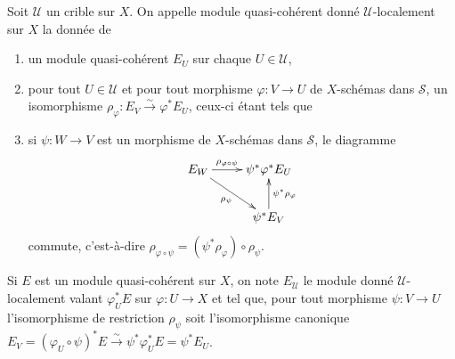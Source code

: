 \documentclass{book}
\newcommand{\sS}{\mathscr{S}}
\newcommand{\sU}{\mathscr{U}}
\newcommand{\iso}{\xrightarrow\sim}
\begin{document}
\subsubsection{}\label{I:1-4-4}

Soit $\sU$ un crible sur $X$. On appelle module quasi-cohérent donné 
$\sU$-localement sur $X$ la donnée de 
\begin{enumerate}[\indent a)]
  \item un module quasi-cohérent $E_U$ sur chaque $U\in\sU$, 
  \item pour tout $U\in\sU$ et pour tout morphisme $\varphi:V\to U$ de 
    $X$-schémas dans $\sS$, un isomorphisme 
    $\rho_\varphi:E_V\iso \varphi^* E_U$, ceux-ci étant tels que 
  \item si $\psi:W\to V$ est un morphisme de $X$-schémas dans $\sS$, le 
    diagramme 
    \[\xymatrix{
      E_W \ar[r]^-{\rho_{\varphi\circ\psi}} \ar[dr]_-{\rho_\psi} 
        & \psi^*\varphi^* E_U \\
      & \psi^* E_V \ar[u]_-{\psi^*\rho_\varphi}
    }\]
    commute, c'est-à-dire 
    $\rho_{\varphi\circ\psi}=(\psi^*\rho_\varphi)\circ \rho_\psi$. 
\end{enumerate}

Si $E$ est un module quasi-cohérent sur $X$, on note $E_\sU$ le module 
donné $\sU$-localement valant $\varphi_U^* E$ sur $\varphi:U\to X$ et tel que, 
pour tout morphisme $\psi:V\to U$ l'isomorphisme de restriction $\rho_\psi$ 
soit l'isomorphisme canonique 
$E_V=(\varphi_U\circ \psi)^* E\iso \psi^* \varphi_U^* E = \psi^* E_U$. 
\end{document}
